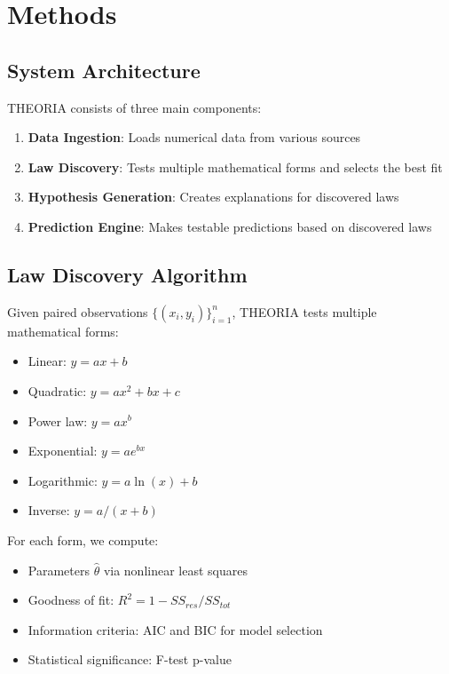 \documentclass[journal,10pt]{IEEEtran}
\begin{document}
\section{Methods}

\subsection{System Architecture}

THEORIA consists of three main components:

\begin{enumerate}
\item \textbf{Data Ingestion}: Loads numerical data from various sources
\item \textbf{Law Discovery}: Tests multiple mathematical forms and selects the best fit
\item \textbf{Hypothesis Generation}: Creates explanations for discovered laws
\item \textbf{Prediction Engine}: Makes testable predictions based on discovered laws
\end{enumerate}

\subsection{Law Discovery Algorithm}

Given paired observations $\{(x_i, y_i)\}_{i=1}^n$, THEORIA tests multiple mathematical forms:

\begin{itemize}
\item Linear: $y = ax + b$
\item Quadratic: $y = ax^2 + bx + c$
\item Power law: $y = ax^b$
\item Exponential: $y = ae^{bx}$
\item Logarithmic: $y = a\ln(x) + b$
\item Inverse: $y = a/(x + b)$
\end{itemize}

For each form, we compute:
\begin{itemize}
\item Parameters $\hat{\theta}$ via nonlinear least squares
\item Goodness of fit: $R^2 = 1 - SS_{res}/SS_{tot}$
\item Information criteria: AIC and BIC for model selection
\item Statistical significance: F-test p-value
\end{itemize}
\end{document}
